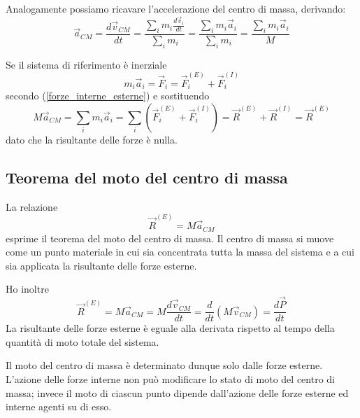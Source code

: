 \documentclass[class=book, crop=false, oneside, 12pt]{standalone}
\begin{document}
Analogamente possiamo ricavare l'accelerazione del centro di massa, derivando:
\begin{equation}
    \overrightarrow{a}_{CM} = \frac{d \overrightarrow{v}_{CM}}{dt} = \frac{\sum_i {m_i \frac{d \overrightarrow{v}_i}{dt}}}{\sum_i m_i} = \frac{\sum_i {m_i \overrightarrow{a}_i}}{\sum_i m_i} = \frac{\sum_i m_i \overrightarrow{a}_i}{M}
\end{equation}

Se il sistema di riferimento è inerziale
\begin{equation*}
    m_i \overrightarrow{a}_i = \overrightarrow{F}_i = \overrightarrow{F}_i^{(E)} + \overrightarrow{F}_i^{(I)}
\end{equation*}
secondo (\ref{forze_interne_esterne}) e sostituendo
\begin{equation}
    M \overrightarrow{a}_{C M}=\sum_i m_{i} \overrightarrow{a}_{i}=\sum_{i}\left(\overrightarrow{F}_{i}^{(E)}+\overrightarrow{F}_{i}^{(I)}\right)=\overrightarrow{R}^{(E)}+\overrightarrow{R}^{(I)}=\overrightarrow{R}^{(E)}
\end{equation}
dato che la risultante delle forze è nulla. 

\subsection{Teorema del moto del centro di massa}

La relazione
\begin{equation}
    \overrightarrow{R}^{(E)} = M \overrightarrow{a}_{C M}
\end{equation}
esprime il teorema del moto del centro di massa. 
Il centro di massa si muove come un punto materiale in cui sia concentrata tutta la massa del sistema e a cui sia applicata la risultante delle forze esterne.

Ho inoltre
\begin{equation}
    \overrightarrow{R}^{(E)} = M \overrightarrow{a}_{C M} = M \frac{d \overrightarrow{v}_{C M}}{dt} = \frac{d}{dt} \left( M \overrightarrow{v}_{C M}\right) = \frac{d \overrightarrow{P}}{dt}
\end{equation}
La risultante delle forze esterne è eguale alla derivata rispetto al tempo della quantità di moto totale del sistema. 

Il moto del centro di massa è determinato dunque solo dalle forze esterne. 
L'azione delle forze interne non può modificare lo stato di moto del centro di massa; invece il moto di ciascun punto dipende dall'azione delle forze esterne ed interne agenti su di esso.
\end{document}
